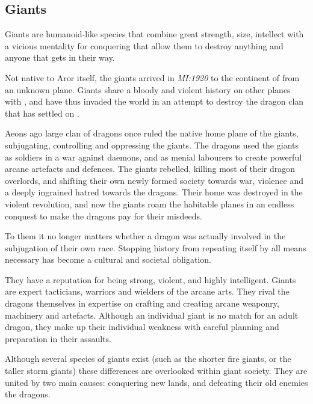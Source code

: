 \subsection{Giants}
\label{sec:Giants}


Giants are humanoid-like species that combine great strength, size, intellect
with a vicious mentality for conquering that allow them to destroy anything and
anyone that gets in their way.

Not native to Aror itself, the giants arrived in \emph{MI:1920} to the continent
of  from an unknown plane. Giants share a bloody and violent
history on other planes with , and have thus invaded the
world in an attempt to destroy the dragon clan that has settled on
.

Aeons ago large clan of dragons once ruled the native home plane of the
giants, subjugating, controlling and oppressing the giants. The dragons used
the giants as soldiers in a war against daemons, and as menial labourers to
create powerful arcane artefacts and defences. The giants rebelled, killing
most of their dragon overlords, and shifting their own newly formed society
towards war, violence and a deeply ingrained hatred towards the dragons. Their
home was destroyed in the violent revolution, and now the giants roam the
habitable planes in an endless conquest to make the dragons pay for their
misdeeds.

To them it no longer matters whether a dragon was actually involved in the
subjugation of their own race. Stopping history from repeating itself by all
means necessary has become a cultural and societal obligation.

They have a reputation for being strong, violent, and highly intelligent.
Giants are expert tacticians, warriors and wielders of the arcane arts. They
rival the dragons themselves in expertise on crafting and creating arcane
weaponry, machinery and artefacts. Although an individual giant is no match
for an adult dragon, they make up their individual weakness with careful
planning and preparation in their assaults.

Although several species of giants exist (such as the shorter fire giants, or
the taller storm giants) these differences are overlooked within giant society.
They are united by two main causes: conquering new lands, and defeating their
old enemies the dragons.


